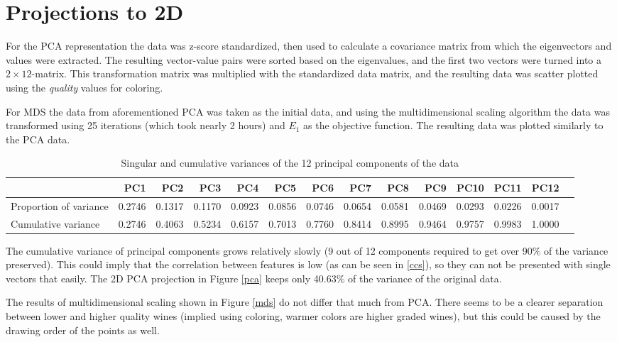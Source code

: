 \documentclass{report}
\begin{document}
\newpage
\section{Projections to 2D}
For the PCA representation the data was z-score standardized, then used to calculate a covariance matrix from which the eigenvectors and values were extracted. The resulting vector-value pairs were sorted based on the eigenvalues, and the first two vectors were turned into a $2\times 12$-matrix. This transformation matrix was multiplied with the standardized data matrix, and the resulting data was scatter plotted using the \textit{quality} values for coloring.

For MDS the data from aforementioned PCA was taken as the initial data, and using the multidimensional scaling algorithm the data was transformed using 25 iterations (which took nearly 2 hours) and $E_1$ as the objective function. The resulting data was plotted similarly to the PCA data.

\begin{table}[H]
\begin{adjustbox}{max width=\textwidth}
\begin{tabular}{l || *{13}{r}}
 & PC1 & PC2 & PC3 & PC4 & PC5 & PC6 & PC7 & PC8 & PC9 & PC10 & PC11 & PC12\\
\hline
Proportion of variance & 0.2746 & 0.1317 & 0.1170 & 0.0923 & 0.0856 & 0.0746 & 0.0654 & 0.0581 & 0.0469 & 0.0293 & 0.0226 & 0.0017\\
Cumulative variance &0.2746 & 0.4063 & 0.5234 & 0.6157 & 0.7013 & 0.7760 & 0.8414 & 0.8995 & 0.9464 & 0.9757 & 0.9983 & 1.0000\\
\end{tabular}
\end{adjustbox}
\caption{Singular and cumulative variances of the 12 principal components of the data}
\end{table}

The cumulative variance of principal components grows relatively slowly (9 out of 12 components required to get over 90\% of the variance preserved). This could imply that the correlation between features is low (as can be seen in \ref{ccs}), so they can not be presented with single vectors that easily. The 2D PCA projection in Figure \ref{pca} keeps only 40.63\% of the variance of the original data.

The results of multidimensional scaling shown in Figure \ref{mds} do not differ that much from PCA. There seems to be a clearer separation between lower and higher quality wines (implied using coloring, warmer colors are higher graded wines), but this could be caused by the drawing order of the points as well.
\end{document}
